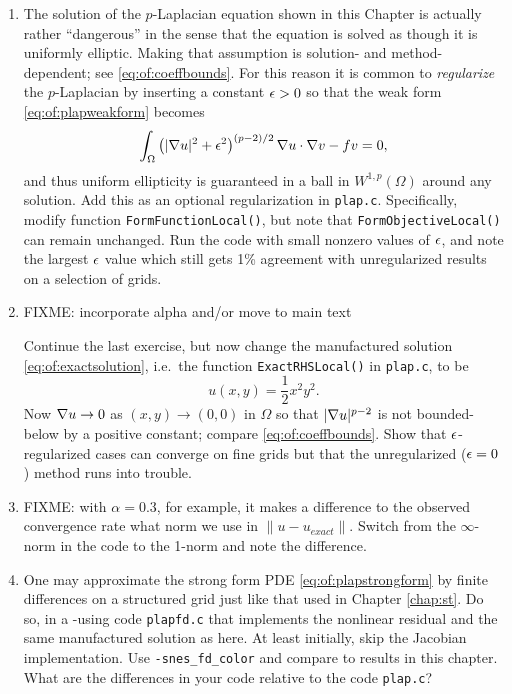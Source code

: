 \begin{enumerate}
\item \label{exer:of:regularize}  The solution of the $p$-Laplacian equation shown in this Chapter is actually rather ``dangerous'' in the sense that the equation is solved as though it is uniformly elliptic.  Making that assumption is solution- and method-dependent; see \eqref{eq:of:coeffbounds}.  For this reason it is common to \emph{regularize} the $p$-Laplacian by inserting a constant $\epsilon>0$ so that the weak form \eqref{eq:of:plapweakform} becomes
\begin{equation}
\int_\Omega \left(|\nabla u|^2+\epsilon^2\right)^{(p-2)/2} \nabla u \cdot \nabla v - f v = 0, \label{eq:of:plapweakformreg}
\end{equation}
and thus uniform ellipticity is guaranteed in a ball in $W^{1,p}(\Omega)$ around any solution.  Add this as an optional regularization in \texttt{plap.c}. Specifically, modify function \texttt{FormFunctionLocal()}, but note that \texttt{FormObjectiveLocal()} can remain unchanged.  Run the code with small nonzero values of $\epsilon$, and note the largest $\epsilon$ value which still gets 1\% agreement with unregularized results on a selection of grids.

\item \label{exer:of:regularizebad}  FIXME: incorporate alpha and/or move to main text

Continue the last exercise, but now change the manufactured solution \eqref{eq:of:exactsolution}, i.e.~the function \texttt{ExactRHSLocal()} in \texttt{plap.c}, to be
\begin{equation}
    u(x,y) = \frac{1}{2} x^2 y^2. \label{eq:of:exactsolutionbad}
\end{equation}
Now $\nabla u \to 0$ as $(x,y)\to(0,0)$ in $\Omega$ so that $|\nabla u|^{p-2}$ is not bounded-below by a positive constant; compare \eqref{eq:of:coeffbounds}.  Show that $\epsilon$-regularized cases can converge on fine grids but that the unregularized ($\epsilon=0$) method runs into trouble.

\item FIXME: with $\alpha=0.3$, for example, it makes a difference to the observed convergence rate what norm we use in $\|u-u_{exact}\|$.  Switch from the $\infty$-norm in the code to the 1-norm and note the difference.

\item One may approximate the strong form PDE \eqref{eq:of:plapstrongform} by finite differences on a structured grid just like that used in Chapter \ref{chap:st}.  Do so, in a \pSNES-using code \texttt{plapfd.c} that implements the nonlinear residual and the same manufactured solution as here.  At least initially, skip the Jacobian implementation.  Use \texttt{-snes\_fd\_color} and compare to results in this chapter.  What are the differences in your code relative to the code \texttt{plap.c}?


\end{enumerate}
